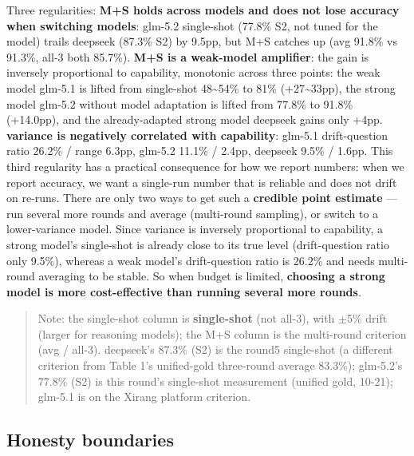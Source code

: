 \documentclass[11pt]{article}
\begin{document}
Three regularities:  \textbf{M+S holds across models and does not lose accuracy when switching models}: glm-5.2 single-shot (77.8\% S2, not tuned for the model) trails deepseek (87.3\% S2) by 9.5pp, but M+S catches up (avg 91.8\% vs 91.3\%, all-3 both 85.7\%).  \textbf{M+S is a weak-model amplifier}: the gain is inversely proportional to capability, monotonic across three points: the weak model glm-5.1 is lifted from single-shot 48\textasciitilde54\% to 81\% (+27\textasciitilde33pp), the strong model glm-5.2 without model adaptation is lifted from 77.8\% to 91.8\% (+14.0pp), and the already-adapted strong model deepseek gains only +4pp.  \textbf{variance is negatively correlated with capability}: glm-5.1 drift-question ratio 26.2\% / range 6.3pp, glm-5.2 11.1\% / 2.4pp, deepseek 9.5\% / 1.6pp. This third regularity has a practical consequence for how we report numbers: when we report accuracy, we want a single-run number that is reliable and does not drift on re-runs. There are only two ways to get such a \textbf{credible point estimate} --- run several more rounds and average (multi-round sampling), or switch to a lower-variance model. Since variance is inversely proportional to capability, a strong model's single-shot is already close to its true level (drift-question ratio only 9.5\%), whereas a weak model's drift-question ratio is 26.2\% and needs multi-round averaging to be stable. So when budget is limited, \textbf{choosing a strong model is more cost-effective than running several more rounds}.

\begin{quote}
Note: the single-shot column is \textbf{single-shot} (not all-3), with $\pm$5\% drift (larger for reasoning models); the M+S column is the multi-round criterion (avg / all-3). deepseek's 87.3\% (S2) is the round5 single-shot (a different criterion from Table 1's unified-gold three-round average 83.3\%); glm-5.2's 77.8\% (S2) is this round's single-shot measurement (unified gold, 10-21); glm-5.1 is on the Xirang platform criterion.
\end{quote}

\subsection{Honesty boundaries}
\end{document}

